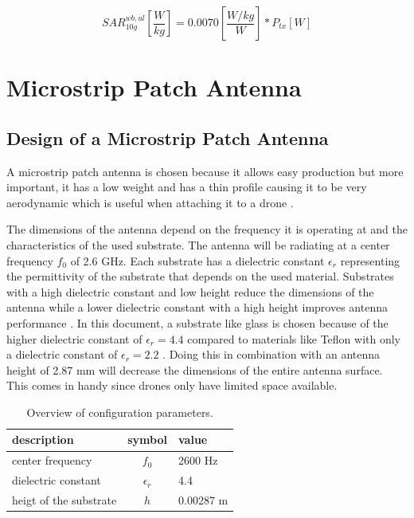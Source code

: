 \begin{equation} 
SAR^{wb,ul}_{10g} \left[\frac{W}{kg}\right] = 0.0070 \left[\frac{W/kg}{W}\right] * P_{tx} [W]
\label{eq:ulToSar}
\end{equation}

\section{Microstrip Patch Antenna}
\subsection{Design of  a Microstrip Patch Antenna}
\label{sub:definingAntenna}
A microstrip patch antenna is chosen because it allows easy production but more important, it has a low weight 
and has a thin profile causing it to be very aerodynamic which is useful when attaching it to a drone \cite{J13_microstripadvantages}.

The dimensions of the antenna depend on the frequency it is operating at and the characteristics of the used substrate.
The antenna will be radiating at a center frequency $f_0$ of 2.6 GHz. Each substrate has a dielectric constant $\epsilon_r$ representing 
the permittivity of the substrate that depends on the used material.
Substrates with a high dielectric constant and low height 
reduce the dimensions of the antenna
while a lower dielectric constant with a high height improves antenna performance \cite{J14_antennadesign,J15_antennadesign}. 
In this document, a substrate like glass 
is chosen because of the higher dielectric constant of $\epsilon_r = 4.4$ compared to materials like Teflon with only a dielectric 
constant of $\epsilon_r = 2.2$ \cite{J14_antennadesign}. 
Doing this in combination with an antenna height of 2.87 mm will decrease the dimensions of the entire antenna surface.
This comes in handy since drones only have limited space available.

\begin{table}[h!]
\centering
\begin{tabular}{|l|c|l|}
\hline
 description            & symbol          & value         \\    \hline
 center frequency       & $f_0$           & 2600 Hz       \\ 
 dielectric constant    & $\epsilon_r$    & 4.4         \\ 
 heigt of the substrate & $h$             & 0.00287 m    \\ \hline
\end{tabular}
\caption{Overview of configuration parameters.}
\label{table:antennaparas}
\end{table}

